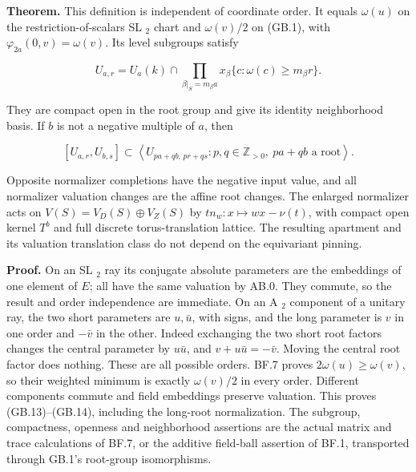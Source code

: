 \documentclass[
  11pt,
]{article}
\begin{document}
\textbf{Theorem.} This definition is independent of coordinate order. It
equals \(\omega(u)\) on the restriction-of-scalars SL \(_2\) chart and
\(\omega(v)/2\) on (GB.1), with \(\varphi_{2a}(0,v)=\omega(v)\). Its
level subgroups satisfy

\[
 U_{a,r}=U_a(k)\cap
 \prod_{\beta|_S=m_\beta a}x_\beta\{c:\omega(c)\ge m_\beta r\}.
 \tag{GB.14}
\]

They are compact open in the root group and give its identity
neighborhood basis. If \(b\) is not a negative multiple of \(a\), then

\[
 [U_{a,r},U_{b,s}]\subset
 \left\langle U_{pa+qb,\,pr+qs}:p,q\in\mathbb Z_{>0},\ pa+qb\text{ a root}\right\rangle.
 \tag{GB.15}
\]

Opposite normalizer completions have the negative input value, and all
normalizer valuation changes are the affine root changes. The enlarged
normalizer acts on \(V(S)=V_D(S)\oplus V_Z(S)\) by
\(tn_w:x\mapsto wx-\nu(t)\), with compact open kernel \(T^b\) and full
discrete torus-translation lattice. The resulting apartment and its
valuation translation class do not depend on the equivariant pinning.

\textbf{Proof.} On an SL \(_2\) ray its conjugate absolute parameters
are the embeddings of one element of \(E\); all have the same valuation
by AB.0. They commute, so the result and order independence are
immediate. On an A \(_2\) component of a unitary ray, the two short
parameters are \(u,\bar u\), with signs, and the long parameter is \(v\)
in one order and \(-\bar v\) in the other. Indeed exchanging the two
short root factors changes the central parameter by \(u\bar u\), and
\(v+u\bar u=-\bar v\). Moving the central root factor does nothing.
These are all possible orders. BF.7 proves \(2\omega(u)\ge\omega(v)\),
so their weighted minimum is exactly \(\omega(v)/2\) in every order.
Different components commute and field embeddings preserve valuation.
This proves (GB.13)--(GB.14), including the long-root normalization. The
subgroup, compactness, openness and neighborhood assertions are the
actual matrix and trace calculations of BF.7, or the additive field-ball
assertion of BF.1, transported through GB.1's root-group isomorphisms.
\end{document}
